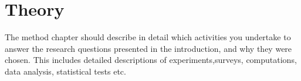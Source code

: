 \chapter{Theory}

The method chapter should describe in detail which activities you undertake to answer the research questions presented in the introduction, and why they were chosen. This includes detailed descriptions of experiments,surveys, computations, data analysis, statistical tests etc.